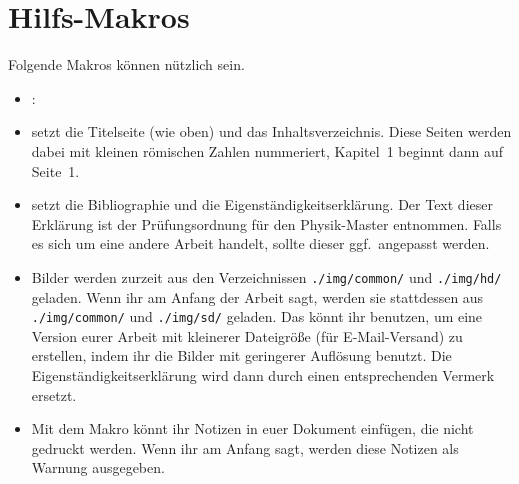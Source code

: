 \section{Hilfs-Makros}
Folgende Makros können nützlich sein.
\begin{itemize}
  \item \texttt{\string\wrap}: 

  \item \texttt{\string\makedocumentstart} setzt die Titelseite (wie oben) und das Inhaltsverzeichnis.
    Diese Seiten werden dabei mit kleinen römischen Zahlen nummeriert, Kapitel~1 beginnt dann auf Seite~1.

  \item \texttt{\string\makedocumentend} setzt die Bibliographie und die Eigenständigkeitserklärung.
    Der Text dieser Erklärung ist der Prüfungsordnung für den Physik-Master entnommen.
    Falls es sich um eine andere Arbeit handelt, sollte dieser ggf.~angepasst werden.

  \item Bilder werden zurzeit aus den Verzeichnissen \texttt{./img/common/} und \texttt{./img/hd/} geladen.
    Wenn ihr am Anfang der Arbeit \texttt{\string\reducesizetrue} sagt, werden sie stattdessen aus \texttt{./img/common/} und \texttt{./img/sd/} geladen.
    Das könnt ihr benutzen, um eine Version eurer Arbeit mit kleinerer Dateigröße (für E-Mail-Versand) zu erstellen, indem ihr die Bilder mit geringerer Auflösung benutzt.
    Die Eigenständigkeitserklärung wird dann durch einen entsprechenden Vermerk ersetzt.

  \item Mit dem Makro \texttt{\string\todo} könnt ihr Notizen in euer Dokument einfügen, die nicht gedruckt werden.
    Wenn ihr am Anfang \texttt{\string\showtodostrue} sagt, werden diese Notizen als Warnung ausgegeben.
\end{itemize}

